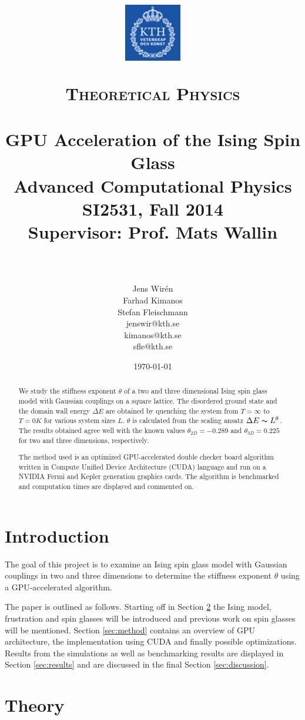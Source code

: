 \documentclass[paper=a4, fontsize=11pt]{scrartcl} %
\title{
\vspace{-2.5cm}
\begin{center}
\includegraphics[width=2.5cm]{logo-kth.png}\\[-1mm]
\hspace{-3mm}
\end{center}
\normalfont \normalsize
\textsc{Theoretical Physics} \\ [25pt] %
\horrule{0.5pt} \\[0.4cm] %
\huge GPU Acceleration of the Ising Spin Glass \\ %
\Large Advanced Computational Physics\\ %
\Large SI2531, Fall 2014\\ %
\Large Supervisor: Prof. Mats Wallin \\ %
\horrule{2pt} \\[0.5cm] %
}
\author{Jens Wir\'{e}n \\
Farhad Kimanos \\
Stefan Fleischmann \\
\normalsize jenswir@kth.se \\
\normalsize kimanos@kth.se \\
\normalsize sfle@kth.se} %
\date{\normalsize\today} %
\numberwithin{equation}{section} %
\numberwithin{figure}{section} %
\numberwithin{table}{section} %
\begin{document}
\maketitle %


\begin{abstract}
We study the stiffness exponent $\theta$ of a two and three dimensional Ising spin glass model with Gaussian couplings on a square lattice. The disordered ground state and the domain wall energy $\Delta E$ are obtained by quenching the system from $T=\infty$ to $T=0 K$ for various system sizes $L$. $\theta$ is calculated from the scaling ansatz $\Delta E \thicksim L^\theta$. The results obtained agree well with the known values $\theta_{2D}=-0.289$ and $\theta_{3D}=0.225$ for two and three dimensions, respectively.

The method used is an optimized GPU-accelerated double checker board algorithm written in Compute Unified Device Architecture (CUDA) language and run on a NVIDIA Fermi and Kepler generation graphics cards. The algorithm is benchmarked and computation times are displayed and commented on.
\end{abstract}

\pagebreak

\tableofcontents

\section{Introduction}

The goal of this project is to examine an Ising spin glass model with Gaussian couplings in two and three dimensions to determine the stiffness exponent $\theta$ using a GPU-accelerated algorithm.

The paper is outlined as follows. Starting off in Section \ref{sec:theory} the Ising model, frustration and spin glasses will be introduced and previous work on spin glasses will be mentioned. Section \ref{sec:method} contains an overview of GPU architecture, the implementation using CUDA and finally possible optimizations. Results from the simulations as well as benchmarking results are displayed in Section \ref{sec:results} and are discussed in the final Section \ref{sec:discussion}.

\section{Theory}
\label{sec:theory}
\end{document}
